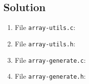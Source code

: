 
\subsection*{Solution}

\lstset{language=c,tabsize=4}
\begin{enumerate}
\item File \texttt{array-utils.c}:

\item File \texttt{array-utils.h}:

\item File \texttt{array-generate.c}:

\item File \texttt{array-generate.h}:

\end{enumerate}
